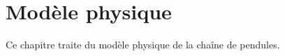 \chapter{Modèle physique}
%
Ce chapitre traite du modèle physique de la chaîne de pendules.
%


%
%
